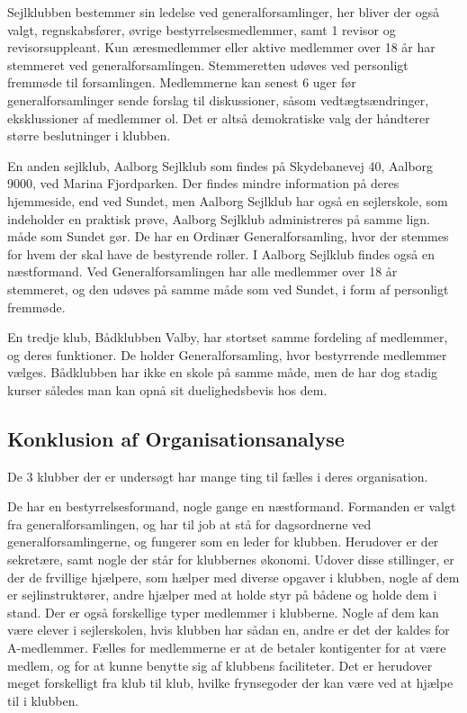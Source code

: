 Sejlklubben bestemmer sin ledelse ved generalforsamlinger, her bliver der også valgt, regnskabsfører, øvrige
bestyrrelsesmedlemmer, samt 1 revisor og revisorsuppleant. Kun æresmedlemmer eller aktive medlemmer over 18 år har
stemmeret ved generalforsamlingen. Stemmeretten udøves ved personligt fremmøde til forsamlingen. Medlemmerne kan senest
6 uger før generalforsamlinger sende forslag til diskussioner, såsom vedtægtsændringer, eksklussioner af medlemmer ol.
Det er altså demokratiske valg der håndterer større beslutninger i klubben.

En anden sejlklub, Aalborg Sejlklub som findes på Skydebanevej 40, Aalborg 9000, ved Marina Fjordparken. Der findes
mindre information på deres hjemmeside, end ved Sundet, men Aalborg Sejlklub har også en sejlerskole, som indeholder en
praktisk prøve,  Aalborg Sejlklub administreres på samme lign. måde som Sundet gør. De har en
Ordinær Generalforsamling, hvor der stemmes for hvem der skal have de bestyrende roller. I Aalborg Sejlklub findes også en næstformand. Ved Generalforsamlingen har alle medlemmer over 18
år stemmeret, og den udøves på samme måde som ved Sundet, i form af personligt fremmøde.\citep{AalborgSejlklub}

En tredje klub, Bådklubben Valby, har stortset samme fordeling af medlemmer, og deres funktioner. De holder Generalforsamling, hvor bestyrrende medlemmer vælges. Bådklubben har ikke en skole på samme måde, men de har dog stadig kurser således man kan opnå sit duelighedsbevis hos dem.\citep{BaadklubbenValby}


\subsection{Konklusion af Organisationsanalyse}

De 3 klubber der er undersøgt har mange ting til fælles i deres organisation.

De har en bestyrrelsesformand, nogle gange en næstformand. Formanden er valgt fra generalforsamlingen, og har til job at stå for dagsordnerne ved generalforsamlingerne, og fungerer som en leder for klubben. Herudover er der sekretære, samt nogle der står for klubbernes økonomi. Udover disse stillinger, er der de frvillige hjælpere, som hælper med diverse opgaver i klubben, nogle af dem er sejlinstruktører, andre hjælper med at holde styr på bådene og holde dem i stand. Der er også forskellige typer medlemmer i klubberne. Nogle af dem kan være elever i sejlerskolen, hvis klubben har sådan en, andre er det der kaldes for A-medlemmer.
Fælles for medlemmerne er at de betaler kontigenter for at være medlem, og for at kunne benytte sig af klubbens faciliteter. Det er herudover meget forskelligt fra klub til klub, hvilke frynsegoder der kan være ved at hjælpe til i klubben.

